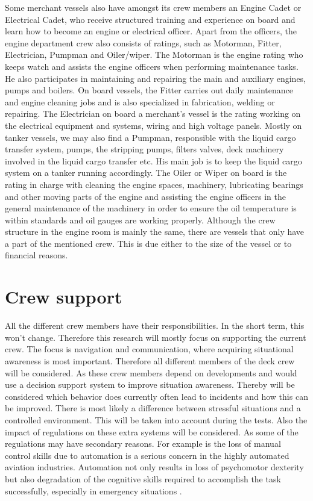 Some merchant vessels also have amongst its crew members an Engine Cadet or Electrical Cadet, who receive structured training and experience on board and learn how to become an engine or electrical officer.
Apart from the officers, the engine department crew also consists of ratings, such as Motorman, Fitter, Electrician, Pumpman and Oiler/wiper.
The Motorman is the engine rating who keeps watch and assists the engine officers when performing maintenance tasks. He also participates in maintaining and repairing the main and auxiliary engines, pumps and boilers.
On board vessels, the Fitter carries out daily maintenance and engine cleaning jobs and is also specialized in fabrication, welding or repairing.
The Electrician on board a merchant's vessel is the rating working on the electrical equipment and systems, wiring and high voltage panels.
Mostly on tanker vessels, we may also find a Pumpman, responsible with the liquid cargo transfer system, pumps, the stripping pumps, filters valves, deck machinery involved in the liquid cargo transfer etc. His main job is to keep the liquid cargo system on a tanker running accordingly.
The Oiler or Wiper on board is the rating in charge with cleaning the engine spaces, machinery, lubricating bearings and other moving parts of the engine and assisting the engine officers in the general maintenance of the machinery in order to ensure the oil temperature is within standards and oil gauges are working properly.
Although the crew structure in the engine room is mainly the same, there are vessels that only have a part of the mentioned crew. This is due either to the size of the vessel or to financial reasons. \cite{Nedcon2013}

\section{Crew support}
All the different crew members have their responsibilities. In the short term, this won't change. Therefore this research will mostly focus on supporting the current crew. The focus is navigation and communication, where acquiring situational awareness is most important. Therefore all different members of the deck crew will be considered. As these crew members depend on developments and would use a decision support system to improve situation awareness.
Thereby will be considered which behavior does currently often lead to incidents and how this can be improved. There is most likely a difference between stressful situations and a controlled environment. This will be taken into account during the tests. Also the impact of regulations on these extra systems will be considered. As some of the regulations may have secondary reasons. For example is the loss of manual control skills due to automation is a serious concern in the highly automated aviation industries. Automation not only results in loss of psychomotor dexterity but also degradation of the cognitive skills required to accomplish the task successfully, especially in emergency situations \cite{Saffarian2012}.

